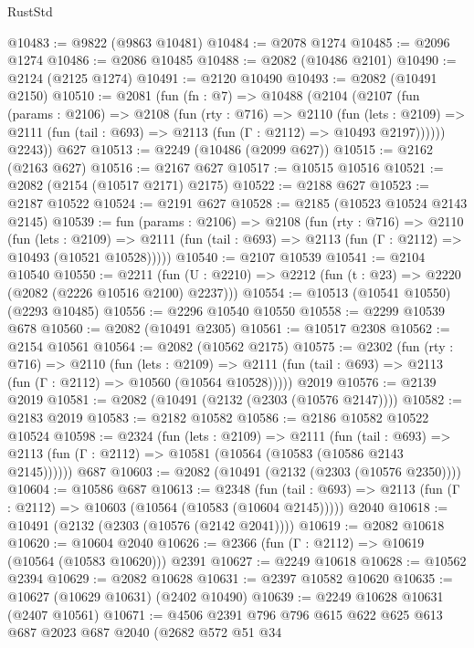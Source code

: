 \begin{lexlean}{RustStd}
\begin{coremodule}
@10483 := @9822 (@9863 @10481)
@10484 := @2078 @1274
@10485 := @2096 @1274
@10486 := @2086 @10485
@10488 := @2082 (@10486 @2101)
@10490 := @2124 (@2125 @1274)
@10491 := @2120 @10490
@10493 := @2082 (@10491 @2150)
@10510 := @2081
    (fun (fn : @7) =>
    @10488
      (@2104
        (@2107
          (fun (params : @2106) =>
          @2108
            (fun (rty : @716) =>
            @2110
              (fun (lets : @2109) =>
              @2111 (fun (tail : @693) => @2113 (fun (Γ : @2112) => @10493 @2197))))))
        @2243))
    @627
@10513 := @2249 (@10486 (@2099 @627))
@10515 := @2162 (@2163 @627)
@10516 := @2167 @627
@10517 := @10515 @10516
@10521 := @2082 (@2154 (@10517 @2171) @2175)
@10522 := @2188 @627
@10523 := @2187 @10522
@10524 := @2191 @627
@10528 := @2185 (@10523 @10524 @2143 @2145)
@10539 := fun (params : @2106) =>
  @2108
    (fun (rty : @716) =>
    @2110
      (fun (lets : @2109) =>
      @2111 (fun (tail : @693) => @2113 (fun (Γ : @2112) => @10493 (@10521 @10528)))))
@10540 := @2107 @10539
@10541 := @2104 @10540
@10550 := @2211
    (fun (U : @2210) => @2212 (fun (t : @23) => @2220 (@2082 (@2226 @10516 @2100) @2237)))
@10554 := @10513 (@10541 @10550) (@2293 @10485)
@10556 := @2296 @10540 @10550
@10558 := @2299 @10539 @678
@10560 := @2082 (@10491 @2305)
@10561 := @10517 @2308
@10562 := @2154 @10561
@10564 := @2082 (@10562 @2175)
@10575 := @2302
    (fun (rty : @716) =>
    @2110
      (fun (lets : @2109) =>
      @2111 (fun (tail : @693) => @2113 (fun (Γ : @2112) => @10560 (@10564 @10528)))))
    @2019
@10576 := @2139 @2019
@10581 := @2082 (@10491 (@2132 (@2303 (@10576 @2147))))
@10582 := @2183 @2019
@10583 := @2182 @10582
@10586 := @2186 @10582 @10522 @10524
@10598 := @2324
    (fun (lets : @2109) =>
    @2111
      (fun (tail : @693) =>
      @2113 (fun (Γ : @2112) => @10581 (@10564 (@10583 (@10586 @2143 @2145))))))
    @687
@10603 := @2082 (@10491 (@2132 (@2303 (@10576 @2350))))
@10604 := @10586 @687
@10613 := @2348
    (fun (tail : @693) => @2113 (fun (Γ : @2112) => @10603 (@10564 (@10583 (@10604 @2145)))))
    @2040
@10618 := @10491 (@2132 (@2303 (@10576 (@2142 @2041))))
@10619 := @2082 @10618
@10620 := @10604 @2040
@10626 := @2366 (fun (Γ : @2112) => @10619 (@10564 (@10583 @10620))) @2391
@10627 := @2249 @10618
@10628 := @10562 @2394
@10629 := @2082 @10628
@10631 := @2397 @10582 @10620
@10635 := @10627 (@10629 @10631) (@2402 @10490)
@10639 := @2249 @10628 @10631 (@2407 @10561)
@10671 := @4506
    @2391
    @796
    @796
    @615
    @622
    @625
    @613
    @687
    @2023
    @687
    @2040
    (@2682
      @572
      @51
      @34

\end{coremodule}
\end{lexlean}
